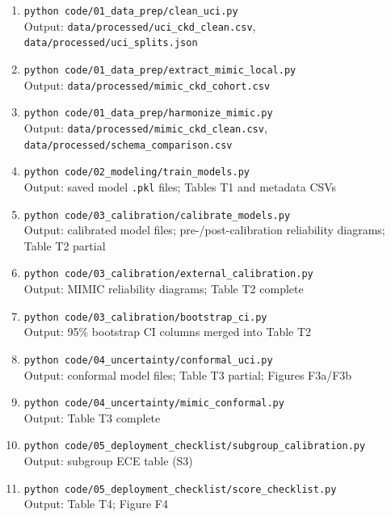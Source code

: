 \documentclass[11pt]{article}
\begin{document}
\begin{enumerate}
\item \texttt{python code/01\_data\_prep/clean\_uci.py}\\
      Output: \texttt{data/processed/uci\_ckd\_clean.csv},
      \texttt{data/processed/uci\_splits.json}

\item \texttt{python code/01\_data\_prep/extract\_mimic\_local.py}\\
      Output: \texttt{data/processed/mimic\_ckd\_cohort.csv}

\item \texttt{python code/01\_data\_prep/harmonize\_mimic.py}\\
      Output: \texttt{data/processed/mimic\_ckd\_clean.csv},
      \texttt{data/processed/schema\_comparison.csv}

\item \texttt{python code/02\_modeling/train\_models.py}\\
      Output: saved model \texttt{.pkl} files; Tables T1 and metadata CSVs

\item \texttt{python code/03\_calibration/calibrate\_models.py}\\
      Output: calibrated model files; pre-/post-calibration reliability
      diagrams; Table T2 partial

\item \texttt{python code/03\_calibration/external\_calibration.py}\\
      Output: MIMIC reliability diagrams; Table T2 complete

\item \texttt{python code/03\_calibration/bootstrap\_ci.py}\\
      Output: 95\% bootstrap CI columns merged into Table T2

\item \texttt{python code/04\_uncertainty/conformal\_uci.py}\\
      Output: conformal model files; Table T3 partial; Figures F3a/F3b

\item \texttt{python code/04\_uncertainty/mimic\_conformal.py}\\
      Output: Table T3 complete

\item \texttt{python code/05\_deployment\_checklist/subgroup\_calibration.py}\\
      Output: subgroup ECE table (S3)

\item \texttt{python code/05\_deployment\_checklist/score\_checklist.py}\\
      Output: Table T4; Figure F4
\end{enumerate}
\end{document}

